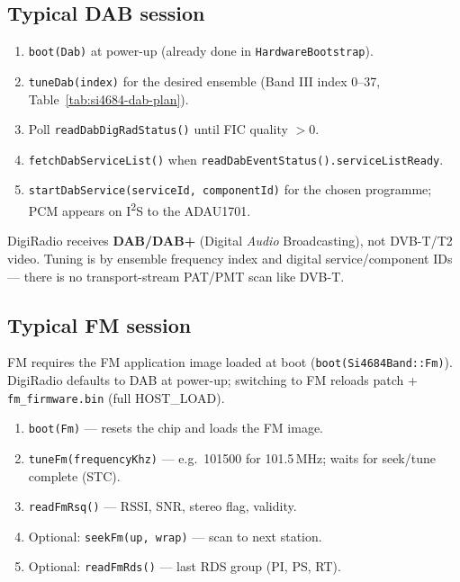 \subsection{Typical DAB session}
\label{sec:si4684-dab-session}

\begin{enumerate}
  \item \texttt{boot(Dab)} at power-up (already done in
    \texttt{HardwareBootstrap}).
  \item \texttt{tuneDab(index)} for the desired ensemble (Band III index
    0--37, Table~\ref{tab:si4684-dab-plan}).
  \item Poll \texttt{readDabDigRadStatus()} until FIC quality $> 0$.
  \item \texttt{fetchDabServiceList()} when
    \texttt{readDabEventStatus().serviceListReady}.
  \item \texttt{startDabService(serviceId, componentId)} for the chosen
    programme; PCM appears on I\textsuperscript{2}S to the ADAU1701.
\end{enumerate}

\begin{drnote}
DigiRadio receives \textbf{DAB/DAB+} (Digital \emph{Audio} Broadcasting),
not DVB-T/T2 video. Tuning is by ensemble frequency index and digital
service/component IDs --- there is no transport-stream PAT/PMT scan like
DVB-T.
\end{drnote}

\subsection{Typical FM session}
\label{sec:si4684-fm-session}

FM requires the FM application image loaded at boot
(\texttt{boot(Si4684Band::Fm)}). DigiRadio defaults to DAB at power-up;
switching to FM reloads patch + \texttt{fm\_firmware.bin} (full HOST\_LOAD).

\begin{enumerate}
  \item \texttt{boot(Fm)} --- resets the chip and loads the FM image.
  \item \texttt{tuneFm(frequencyKhz)} --- e.g.\ 101500 for 101.5\,MHz;
        waits for seek/tune complete (STC).
  \item \texttt{readFmRsq()} --- RSSI, SNR, stereo flag, validity.
  \item Optional: \texttt{seekFm(up, wrap)} --- scan to next station.
  \item Optional: \texttt{readFmRds()} --- last RDS group (PI, PS, RT).
\end{enumerate}

